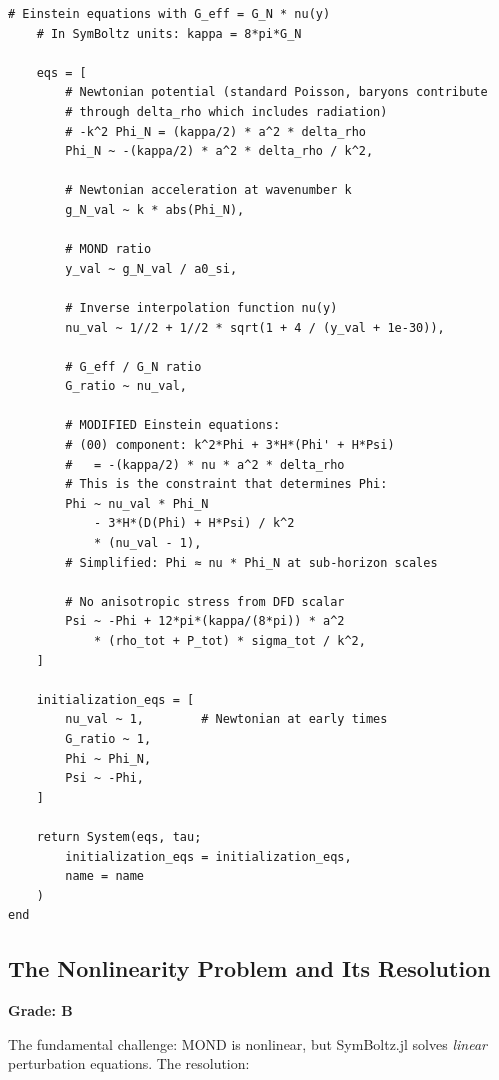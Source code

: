 \documentclass[11pt,a4paper]{article}
\begin{document}
\begin{lstlisting}[caption={Complete DFD gravity replacing GR in SymBoltz.jl},label={lst:gravity}]
    # Einstein equations with G_eff = G_N * nu(y)
    # In SymBoltz units: kappa = 8*pi*G_N

    eqs = [
        # Newtonian potential (standard Poisson, baryons contribute
        # through delta_rho which includes radiation)
        # -k^2 Phi_N = (kappa/2) * a^2 * delta_rho
        Phi_N ~ -(kappa/2) * a^2 * delta_rho / k^2,

        # Newtonian acceleration at wavenumber k
        g_N_val ~ k * abs(Phi_N),

        # MOND ratio
        y_val ~ g_N_val / a0_si,

        # Inverse interpolation function nu(y)
        nu_val ~ 1//2 + 1//2 * sqrt(1 + 4 / (y_val + 1e-30)),

        # G_eff / G_N ratio
        G_ratio ~ nu_val,

        # MODIFIED Einstein equations:
        # (00) component: k^2*Phi + 3*H*(Phi' + H*Psi)
        #   = -(kappa/2) * nu * a^2 * delta_rho
        # This is the constraint that determines Phi:
        Phi ~ nu_val * Phi_N
            - 3*H*(D(Phi) + H*Psi) / k^2
            * (nu_val - 1),
        # Simplified: Phi ≈ nu * Phi_N at sub-horizon scales

        # No anisotropic stress from DFD scalar
        Psi ~ -Phi + 12*pi*(kappa/(8*pi)) * a^2
            * (rho_tot + P_tot) * sigma_tot / k^2,
    ]

    initialization_eqs = [
        nu_val ~ 1,        # Newtonian at early times
        G_ratio ~ 1,
        Phi ~ Phi_N,
        Psi ~ -Phi,
    ]

    return System(eqs, tau;
        initialization_eqs = initialization_eqs,
        name = name
    )
end
\end{lstlisting}

\subsection{The Nonlinearity Problem and Its Resolution}

\textbf{Grade: B}

The fundamental challenge: MOND is nonlinear, but SymBoltz.jl solves \emph{linear} perturbation equations. The resolution:
\end{document}
